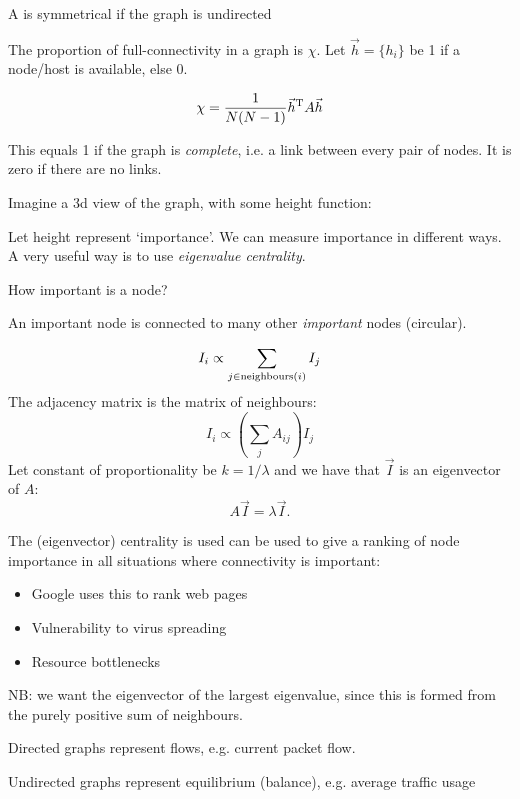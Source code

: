 \documentclass{slides}
\begin{document}
A is symmetrical if the graph is undirected


The proportion of full-connectivity in a graph is $\chi$.
Let $\vec h = \{h_i\}$ be 1 if a node/host is available, else 0.

$$
\chi = \frac{1}{N(N-1)} \vec h^{\rm T} A \vec h
$$

This equals 1 if the graph is {\em complete}, i.e. a link between
every pair of nodes. It is zero if there are no links.


Imagine a 3d view of the graph, with some height function:


Let height represent `importance'. We can measure importance in
different ways. A very useful way is to use {\em eigenvalue centrality}.


How important is a node?

An important node is connected to many other {\em important} nodes (circular).

$$
I_i \propto \sum_{j \in {\rm neighbours}(i)} I_j
$$
The adjacency matrix is the matrix of neighbours:
$$
I_i \propto \left( \sum_j A_{ij}\right) I_j
$$
Let constant of proportionality be $k = 1/\lambda$ and we have that $\vec I$ is
an eigenvector of $A$:
$$
A\vec I = \lambda \vec I.
$$



The (eigenvector) centrality is used can be used to give a ranking
of node importance in all situations where connectivity is important:

\begin{itemize}
\item Google uses this to rank web pages
\item Vulnerability to virus spreading
\item Resource bottlenecks
\end{itemize}

NB: we want the eigenvector of the largest eigenvalue, since this
is formed from the purely positive sum of neighbours.


Directed graphs represent flows, e.g. current packet flow.

Undirected graphs represent equilibrium (balance), e.g. average traffic usage
\end{document}
